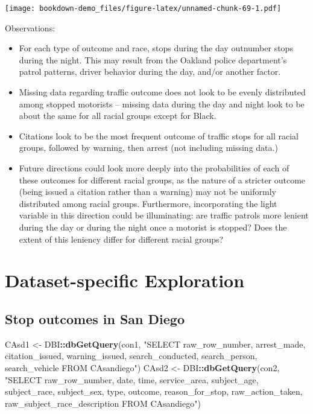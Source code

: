 \documentclass[
]{book}
\newenvironment{Shaded}{\begin{snugshade}}{\end{snugshade}}
\newcommand{\KeywordTok}[1]{\textcolor[rgb]{0.13,0.29,0.53}{\textbf{#1}}}
\newcommand{\NormalTok}[1]{#1}
\newcommand{\OperatorTok}[1]{\textcolor[rgb]{0.81,0.36,0.00}{\textbf{#1}}}
\newcommand{\StringTok}[1]{\textcolor[rgb]{0.31,0.60,0.02}{#1}}
\begin{document}
\texttt{[image: bookdown-demo\_files/figure-latex/unnamed-chunk-69-1.pdf]}

Observations:

\begin{itemize}
\item
  For each type of outcome and race, stops during the day outnumber stops during the night. This may result from the Oakland police department's patrol patterns, driver behavior during the day, and/or another factor.
\item
  Missing data regarding traffic outcome does not look to be evenly distributed among stopped motorists -- missing data during the day and night look to be about the same for all racial groups except for Black.
\item
  Citations look to be the most frequent outcome of traffic stops for all racial groups, followed by warning, then arrest (not including missing data.)
\item
  Future directions could look more deeply into the probabilities of each of these outcomes for different racial groups, as the nature of a stricter outcome (being issued a citation rather than a warning) may not be uniformly distributed among racial groups. Furthermore, incorporating the light variable in this direction could be illuminating: are traffic patrols more lenient during the day or during the night once a motorist is stopped? Does the extent of this leniency differ for different racial groups?
\end{itemize}

\hypertarget{dataset-specific-exploration}{%
\section{Dataset-specific Exploration}\label{dataset-specific-exploration}}

\hypertarget{stop-outcomes-in-san-diego}{%
\subsection{Stop outcomes in San Diego}\label{stop-outcomes-in-san-diego}}

\begin{Shaded}
\begin{Highlighting}[]
\NormalTok{CAsd1 <-}\StringTok{ }\NormalTok{DBI}\OperatorTok{::}\KeywordTok{dbGetQuery}\NormalTok{(con1, }\StringTok{"SELECT raw_row_number, arrest_made, citation_issued, warning_issued, search_conducted, search_person, search_vehicle FROM CAsandiego"}\NormalTok{)}
\NormalTok{CAsd2 <-}\StringTok{ }\NormalTok{DBI}\OperatorTok{::}\KeywordTok{dbGetQuery}\NormalTok{(con2, }\StringTok{"SELECT raw_row_number, date, time, service_area, subject_age, subject_race, subject_sex, type, outcome, reason_for_stop, raw_action_taken, raw_subject_race_description FROM CAsandiego"}\NormalTok{)}
\end{Highlighting}
\end{Shaded}
\end{document}
